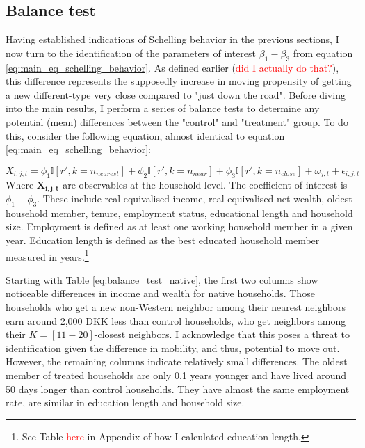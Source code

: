 \documentclass[main.tex]{subfiles}
\begin{document}
\subsection{Balance test}

Having established indications of Schelling behavior in the previous sections, I now turn to the identification of the parameters of interest $\beta_1-\beta_3$ from equation \ref{eq:main_eq_schelling_behavior}. As defined earlier (\textcolor{red}{did I actually do that?}), this difference represents the supposedly increase in moving propensity of getting a new different-type very close compared to "just down the road". Before diving into the main results, I perform a series of balance tests to determine any potential (mean) differences between the "control" and "treatment" group. To do this, consider the following equation, almost identical to equation \ref{eq:main_eq_schelling_behavior}:

\begin{equation}
    X_{i, j, t} = \phi_1 \mathbb{I}[r', k=n_{nearest}] + \phi_2 \mathbb{I}[r', k = n_{near}] + \phi_3 \mathbb{I}[r', k = n_{close}] + \omega_{j, t} + \epsilon_{i, j, t} 
    \label{eq:balance_tests}
\end{equation}
Where $\mathbf{X_{i,j,t}}$ are observables at the household level. The coefficient of interest is $\phi_1 - \phi_3$. These include real equivalised income, real equivalised net wealth, oldest household member, tenure, employment status, educational length and household size. Employment is defined as at least one working household member in a given year. Education length is defined as the best educated household member measured in years.\footnote{See Table \textcolor{red}{here} in Appendix of how I calculated education length.}

Starting with Table \ref{eq:balance_test_native}, the first two columns show noticeable differences in income and wealth for native households. Those households who get a new non-Western neighbor among their nearest neighbors earn around 2,000 DKK less than control households, who get neighbors among their $K=[11-20]$-closest neighbors. I acknowledge that this poses a threat to identification given the difference in mobility, and thus, potential to move out. However, the remaining columns indicate relatively small differences. The oldest member of treated households are only 0.1 years younger and have lived around 50 days longer than control households. They have almost the same employment rate, are similar in education length and household size. 
\end{document}
